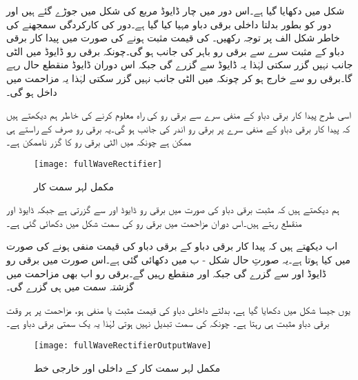 

شکل  میں  دکھایا گیا ہے۔اس دور میں چار ڈایوڈ مربع کی شکل میں جوڑے گئے ہیں اور دور کو  بطور بدلتا داخلی برقی دباو مہیا کیا گیا ہے۔دور کی کارکردگی سمجھنے کی خاطر شکل  الف  پر توجہ رکھیں۔ کی قیمت مثبت ہونے کی صورت میں پیدا کار برقی دباو کے مثبت   سرے سے برقی رو باہر کی جانب ہو گی۔چونکہ برقی رو ڈایوڈ میں الٹی جانب نہیں گزر سکتی لہٰذا یہ ڈایوڈ  سے گزرے گی جبکہ اس دوران ڈایوڈ  منقطع حال رہے گا۔برقی رو  سے خارج ہو کر چونکہ  میں الٹی جانب نہیں گزر سکتی لہٰذا یہ مزاحمت  میں داخل ہو گی۔

اسی طرح پیدا کار برقی دباو کے منفی سرے سے برقی رو کی راہ معلوم کرنے کی خاطر ہم دیکھتے ہیں کہ پیدا کار برقی دباو کے منفی  سرے پر برقی رو اندر کی جانب ہو گی۔یہ برقی رو صرف  کے راستے ہی ممکن ہے چونکہ  میں الٹی برقی رو کا گزر ناممکن ہے۔
\begin{figure}
\centering
\texttt{[image: fullWaveRectifier]}
\caption{مکمل لہر سمت کار}
\label{شکل_مکمل_لہر_سمت_کار}
\end{figure}
ہم دیکھتے ہیں کہ مثبت برقی دباو کی صورت میں برقی رو ڈایوڈ   اور   سے گزرتی ہے جبکہ ڈایوڈ   اور   منقطع رہتے ہیں۔اس دوران مزاحمت میں برقی رو کی سمت شکل میں دکھائی گئی ہے۔

اب دیکھتے ہیں کہ پیدا کار برقی دباو کے برقی دباو کی قیمت منفی ہونے کی صورت میں کیا ہوتا ہے۔یہ صورتِ حال شکل  - ب میں دکھائی گئی ہے۔اس صورت میں برقی رو ڈایوڈ   اور  سے گزرے گی جبکہ   اور   منقطع رہیں گے۔برقی رو اب بھی مزاحمت میں گزشتہ سمت میں ہی گزرے گی۔

یوں جیسا شکل   میں دکھایا گیا ہے، بدلتے داخلی دباو  کی قیمت مثبت یا منفی ہو، مزاحمت پر ہر وقت برقی دباو مثبت ہی رہتا ہے۔ چونکہ  کی سمت تبدیل نہیں ہوتی لہٰذا یہ یک سمتی برقی دباو ہے۔
\begin{figure}
\centering
\texttt{[image: fullWaveRectifierOutputWave]}
\caption{مکمل لہر سمت کار کے داخلی اور خارجی خط}
\label{شکل_مکمل_لہر_سمت_کار_کے_خط}
\end{figure}


